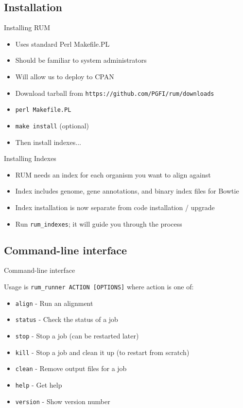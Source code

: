 \documentclass{beamer}
\begin{document}
\subsection{Installation}

\begin{frame}{Installing RUM}
  \begin{itemize}
  \item Uses standard Perl Makefile.PL
  \item Should be familiar to system administrators
  \item Will allow us to deploy to CPAN
  \item Download tarball from \texttt{https://github.com/PGFI/rum/downloads}
  \item \texttt{perl Makefile.PL}
  \item \texttt{make install} (optional)
  \item Then install indexes...
  \end{itemize}
\end{frame}

\begin{frame}{Installing Indexes}
  \begin{itemize}
  \item RUM needs an index for each organism you want to align against
  \item Index includes genome, gene annotations, and binary index files for Bowtie
  \item Index installation is now separate from code installation / upgrade
  \item Run \texttt{rum\_indexes}; it will guide you through the process
  \end{itemize}
\end{frame}

\subsection{Command-line interface}

\begin{frame}{Command-line interface}

  Usage is \texttt{rum\_runner ACTION [OPTIONS]} where action is one of:

  \begin{itemize}
  \item \texttt{align} - Run an alignment
  \item \texttt{status} - Check the status of a job
  \item \texttt{stop} - Stop a job (can be restarted later)
  \item \texttt{kill} - Stop a job and clean it up (to restart from scratch)
  \item \texttt{clean} - Remove output files for a job
  \item \texttt{help} - Get help
  \item \texttt{version} - Show version number
  \end{itemize}

\end{frame}
\end{document}
